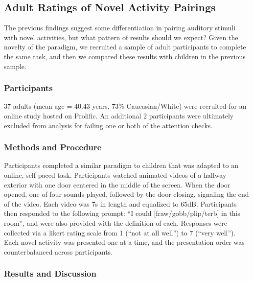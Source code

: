 \documentclass[10pt, letterpaper]{article}
\begin{document}
\hypertarget{adult-ratings-of-novel-activity-pairings}{%
\subsection{Adult Ratings of Novel Activity
Pairings}\label{adult-ratings-of-novel-activity-pairings}}

The previous findings suggest some differentiation in pairing auditory
stimuli with novel activities, but what pattern of results should we
expect? Given the novelty of the paradigm, we recruited a sample of
adult participants to complete the same task, and then we compared these
results with children in the previous sample.

\hypertarget{participants-2}{%
\subsubsection{Participants}\label{participants-2}}

37 adults (mean age = 40.43 years, 73\% Caucasian/White) were recruited
for an online study hosted on Prolific. An additional 2 participants
were ultimately excluded from analysis for failing one or both of the
attention checks.

\hypertarget{methods-and-procedure}{%
\subsubsection{Methods and Procedure}\label{methods-and-procedure}}

Participants completed a similar paradigm to children that was adapted
to an online, self-paced task. Participants watched animated videos of a
hallway exterior with one door centered in the middle of the screen.
When the door opened, one of four sounds played, followed by the door
closing, signaling the end of the video. Each video was 7s in length and
equalized to 65dB. Participants then responded to the following prompt:
``I could {[}fraw/gobb/plip/terb{]} in this room'', and were also
provided with the definition of each. Responses were collected via a
likert rating scale from 1 (``not at all well'') to 7 (``very well'').
Each novel activity was presented one at a time, and the presentation
order was counterbalanced across participants.

\hypertarget{results-and-discussion-2}{%
\subsubsection{Results and Discussion}\label{results-and-discussion-2}}
\end{document}
